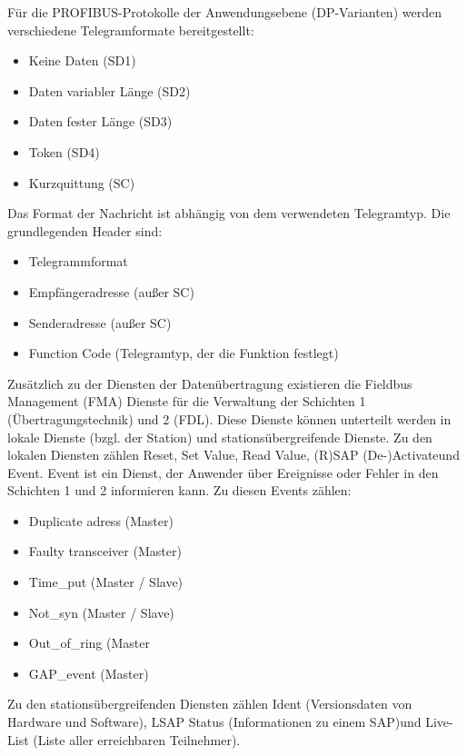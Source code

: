 Für die PROFIBUS-Protokolle der Anwendungsebene (DP-Varianten) werden verschiedene Telegramformate bereitgestellt:
\begin{itemize}
\item Keine Daten (SD1)
\item Daten variabler Länge (SD2)
\item Daten fester Länge (SD3)
\item Token (SD4)
\item Kurzquittung (SC)
\end{itemize}
\citep{Profibus8}

Das Format der Nachricht ist abhängig von dem verwendeten Telegramtyp. Die grundlegenden Header sind:
\begin{itemize}
\item Telegrammformat
\item Empfängeradresse (außer SC)
\item Senderadresse (außer SC)
\item Function Code (Telegramtyp, der die Funktion festlegt)
\end{itemize}
\citep{Profibus8}

Zusätzlich zu der Diensten der Datenübertragung existieren die Fieldbus Management (FMA) Dienste für die Verwaltung der Schichten 1 (Übertragungstechnik) und 2 (FDL). Diese Dienste können unterteilt werden in lokale Dienste (bzgl. der Station) und stationsübergreifende Dienste. Zu den lokalen Diensten zählen \glqq Reset\grqq , \glqq Set Value\grqq , \glqq Read Value\grqq , \glqq (R)SAP (De-)Activate\grqq  und \glqq Event\grqq . Event ist ein Dienst, der Anwender über Ereignisse oder Fehler in den Schichten 1 und 2 informieren kann. Zu diesen Events zählen:
\begin{itemize}
\item Duplicate adress (Master)
\item Faulty transceiver (Master)
\item Time\_put (Master / Slave)
\item Not\_syn (Master / Slave)
\item Out\_of\_ring (Master
\item GAP\_event (Master)
\end{itemize}

Zu den stationsübergreifenden Diensten zählen \glqq Ident (Versionsdaten von Hardware und Software)\grqq , \glqq LSAP Status (Informationen zu einem SAP)\grqq  und \glqq Live-List (Liste aller erreichbaren Teilnehmer)\grqq \citep{Profibus12}.\\

